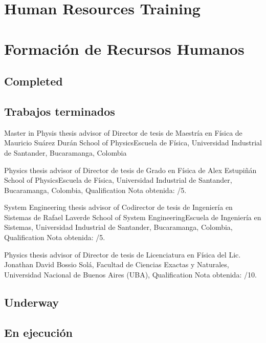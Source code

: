 \ifeng
\section*{Human Resources Training}
\else
\section*{Formación de Recursos Humanos}
\fi


\ifeng
\subsection*{Completed}
\else
\subsection*{Trabajos terminados}
\fi

\ifeng
Master in Physis thesis advisor of
\else
Director de tesis de Maestría en Física de
\fi
Mauricio Suárez Durán \at \ifeng School of Physics\else Escuela de Física\fi, Universidad Industrial de Santander, Bucaramanga, Colombia

\ifeng
Physics thesis advisor of
\else
Director de tesis de Grado en Física de
\fi
Alex Estupiñán \at \ifeng School of Physics\else Escuela de Física\fi, Universidad Industrial de Santander, Bucaramanga, Colombia, \ifeng Qualification \else Nota obtenida: /5.

\ifeng
System Engineering thesis advisor of
\else
Codirector de tesis de Ingeniería en Sistemas de
\fi
Rafael Laverde \at \ifeng School of System Engineering\else Escuela de Ingeniería en Sistemas\fi, Universidad Industrial de Santander, Bucaramanga, Colombia, \ifeng Qualification \else Nota obtenida: /5.

\ifeng
Physics thesis advisor of
\else
Director de tesis de Licenciatura en Física del
\fi
Lic. Jonathan David Bossio Solá, \at Facultad de Ciencias Exactas y Naturales, Universidad Nacional de Buenos Aires (UBA), \ifeng Qualification \else Nota obtenida: /10.

\ifeng
\subsection*{Underway}
\else
\subsection*{En ejecución}
\fi


